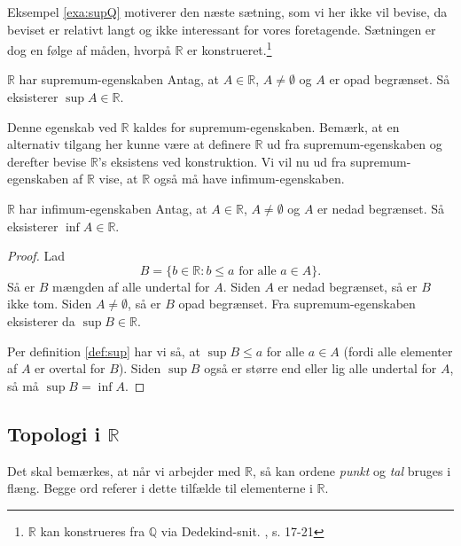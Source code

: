 Eksempel \ref{exa:supQ} motiverer den næste sætning, som vi her ikke vil bevise, da beviset er relativt langt og ikke interessant for vores foretagende.
Sætningen er dog en følge af måden, hvorpå $\mathbb{R}$ er konstrueret.\footnote{$\mathbb{R}$ kan konstrueres fra $\mathbb{Q}$ via Dedekind-snit. \cite{Rudin1976}, s. 17-21}

\begin{theorem}[label=theo:supremum-egenskab]{$\mathbb{R}$ har supremum-egenskaben}{}
  Antag, at $A \in \mathbb{R}$, $A \neq \emptyset$ og $A$ er opad begrænset. 
  Så eksisterer $\sup A \in \mathbb{R}$.
\end{theorem}

Denne egenskab ved $\mathbb{R}$ kaldes for supremum-egenskaben. 
Bemærk, at en alternativ tilgang her kunne være at definere $\mathbb{R}$ ud fra supremum-egenskaben og derefter bevise $\mathbb{R}$'s eksistens ved konstruktion.
Vi vil nu ud fra supremum-egenskaben af $\mathbb{R}$ vise, at $\mathbb{R}$ også må have infimum-egenskaben. 

\begin{theorem}[label=theo:infimum-egenskab]{$\mathbb{R}$ har infimum-egenskaben  }{}
  Antag, at $A \in \mathbb{R}$, $A \neq \emptyset$ og $A$ er nedad begrænset.
  Så eksisterer $\inf A \in \mathbb{R}$.
\end{theorem}
\begin{proof} 
  Lad 
  \[
  B=\{ b \in \mathbb{R} : b \leq a \text{ for alle } a \in A \}.
  \]  
  Så er $B$ mængden af alle undertal for $A$.
  Siden $A$ er nedad begrænset, så er $B$ ikke tom.
  Siden $A \neq \emptyset$, så er $B$ opad begrænset. 
  Fra supremum-egenskaben eksisterer da $\sup B \in \mathbb{R}$. 

  Per definition \ref{def:sup} har vi så, at $\sup B \leq a$ for alle $a \in A$ (fordi alle elementer af $A$ er overtal for $B$). 
  Siden $\sup B$ også er større end eller lig alle undertal for $A$, så må $\sup B=\inf A$. 
\end{proof}

\subsection{Topologi i $\mathbb{R}$}%
  \label{sub:Topologi i R}
Det skal bemærkes, at når vi arbejder med $\mathbb{R}$, så kan ordene \textit{punkt} og \textit{tal} bruges i flæng.
Begge ord referer i dette tilfælde til elementerne i $\mathbb{R}$.
  
